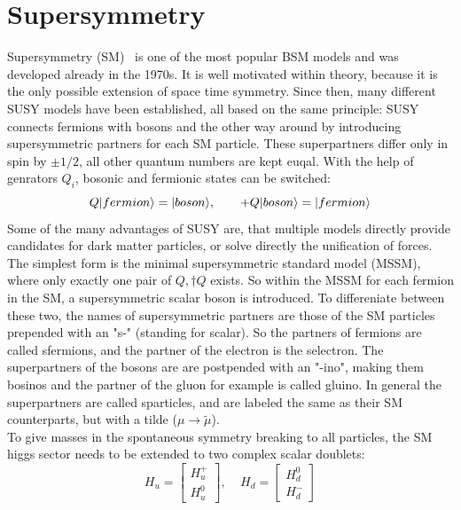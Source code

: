 \section{Supersymmetry}\label{sec:SUSY}
Supersymmetry (SM)~\cite{SUSYOriginal,SUSYPrimer} is one of the most popular BSM models and was developed already in the 1970s. It is well motivated within theory, because it is the only possible extension of space time symmetry. Since then, many different SUSY models have been established, all based on the same principle: SUSY connects fermions with bosons and the other way around by introducing supersymmetric partners for each SM particle. These superpartners differ only in spin by $\pm1/2$, all other quantum numbers are kept euqal. With the help of genrators $Q_i$, bosonic and fermionic states can be switched:
\begin{equation}
  Q\lvert fermion\rangle=\lvert boson\rangle,~~~~~~+ Q\lvert boson\rangle=\lvert fermion\rangle
\end{equation}
Some of the many advantages of SUSY are, that multiple models directly provide candidates for dark matter particles, or solve directly the unification of forces.\\
The simplest form is the minimal supersymmetric standard model (MSSM), where only exactly one pair of $Q,\dagger{Q}$ exists. So within the MSSM for each fermion in the SM, a supersymmetric scalar boson is introduced. To differeniate between these two, the names of supersymmetric partners are those of the SM particles prepended with an "s-" (standing for scalar). So the partners of fermions are called sfermions, and \eg the partner of the electron is the selectron. The superpartners of the bosons are are postpended with an "-ino", making them bosinos and the partner of the gluon for example is called gluino. In general the superpartners are called sparticles, and are labeled the same as their SM counterparts, but with a tilde ($\mu \to \tilde{\mu}$).\\
To give masses in the spontaneous symmetry breaking to all particles, the SM higgs sector needs to be extended to two complex scalar doublets:
\begin{equation}
H_u=  \left[
  \begin{matrix}
    H_u^+ \\
    H_u^0
  \end{matrix}
  \right],~~~~~
  H_d=  \left[
    \begin{matrix}
      H_d^0 \\
      H_d^-
    \end{matrix}
    \right]
\end{equation}
